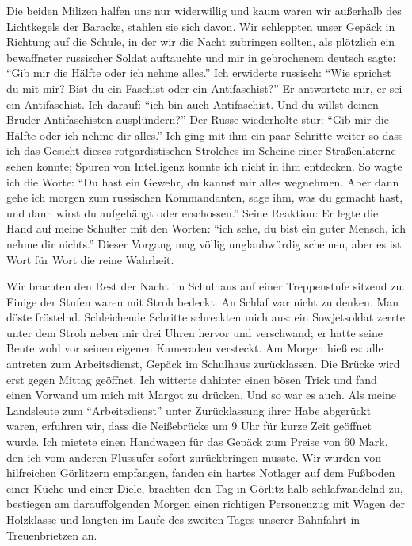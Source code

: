 Die beiden Milizen halfen uns nur widerwillig und kaum waren wir außerhalb des Lichtkegels der Baracke, stahlen sie sich davon. Wir schleppten unser Gepäck in Richtung auf die Schule, in der wir die Nacht zubringen sollten, als plötzlich ein bewaffneter russischer Soldat auftauchte und mir in gebrochenem deutsch sagte: \enquote{Gib mir die Hälfte oder ich nehme alles.} Ich erwiderte russisch: \enquote{Wie sprichst du mit mir? Bist du ein Faschist oder ein Antifaschist?} Er antwortete mir, er sei ein Antifaschist. Ich darauf: \enquote{ich bin auch Antifaschist. Und du willst deinen Bruder Antifaschisten ausplündern?} Der Russe wiederholte stur: \enquote{Gib mir die Hälfte oder ich nehme dir alles.} Ich ging mit ihm ein paar Schritte weiter so dass ich das Gesicht dieses rotgardistischen Strolches im Scheine einer Straßenlaterne sehen konnte; Spuren von Intelligenz konnte ich nicht in ihm entdecken. So wagte ich die Worte: \enquote{Du hast ein Gewehr, du kannst mir alles wegnehmen. Aber dann gehe ich morgen zum russischen Kommandanten, sage ihm, was du gemacht hast, und dann wirst du aufgehängt oder erschossen.} Seine Reaktion: Er legte die Hand auf meine Schulter mit den Worten: \enquote{ich sehe, du bist ein guter Mensch, ich nehme dir nichts.} Dieser Vorgang mag völlig unglaubwürdig scheinen, aber es ist Wort für Wort die reine Wahrheit.

 Wir brachten den Rest der Nacht im Schulhaus auf einer Treppenstufe sitzend zu. Einige der Stufen waren mit Stroh bedeckt. An Schlaf war nicht zu denken. Man döste fröstelnd. Schleichende Schritte schreckten mich aus: ein Sowjetsoldat zerrte unter dem Stroh neben mir drei Uhren hervor und verschwand; er hatte seine Beute wohl vor seinen eigenen Kameraden versteckt. Am Morgen hieß es: alle antreten zum Arbeitsdienst, Gepäck im Schulhaus zurücklassen. Die Brücke wird erst gegen Mittag geöffnet. Ich witterte dahinter einen bösen Trick und fand einen Vorwand um mich mit Margot zu drücken. Und so war es auch. Als meine Landsleute zum \enquote{Arbeitsdienst} unter Zurücklassung ihrer Habe abgerückt waren, erfuhren wir, dass die Neißebrücke um 9 Uhr für kurze Zeit geöffnet wurde. Ich mietete einen Handwagen für das Gepäck zum Preise von 60 Mark, den ich vom anderen Flussufer sofort zurückbringen musste. Wir wurden von hilfreichen Görlitzern empfangen, fanden ein hartes Notlager auf dem Fußboden einer Küche und einer Diele, brachten den Tag in Görlitz halb-schlafwandelnd zu, bestiegen am darauffolgenden Morgen einen richtigen Personenzug mit Wagen der Holzklasse und langten im Laufe des zweiten Tages unserer Bahnfahrt in Treuenbrietzen an.

